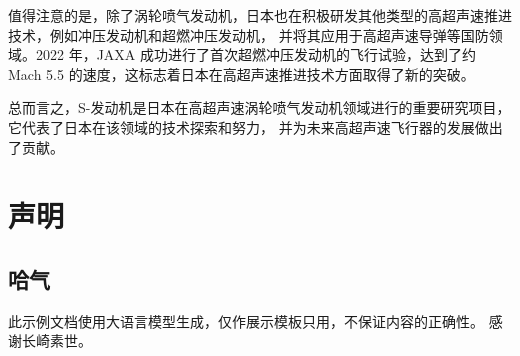 \documentclass{pkuthesis}
\begin{document}
值得注意的是，除了涡轮喷气发动机，日本也在积极研发其他类型的高超声速推进技术，例如冲压发动机和超燃冲压发动机，
并将其应用于高超声速导弹等国防领域。2022 年，JAXA 成功进行了首次超燃冲压发动机的飞行试验，达到了约 Mach 5.5
的速度，这标志着日本在高超声速推进技术方面取得了新的突破。

总而言之，S-发动机是日本在高超声速涡轮喷气发动机领域进行的重要研究项目，它代表了日本在该领域的技术探索和努力，
并为未来高超声速飞行器的发展做出了贡献。
\printbibliography
\appendix
\section{声明}
\subsection{哈气}
此示例文档使用大语言模型生成，仅作展示模板只用，不保证内容的正确性。
\acknowledgments
感谢长崎素世。
\end{document}
